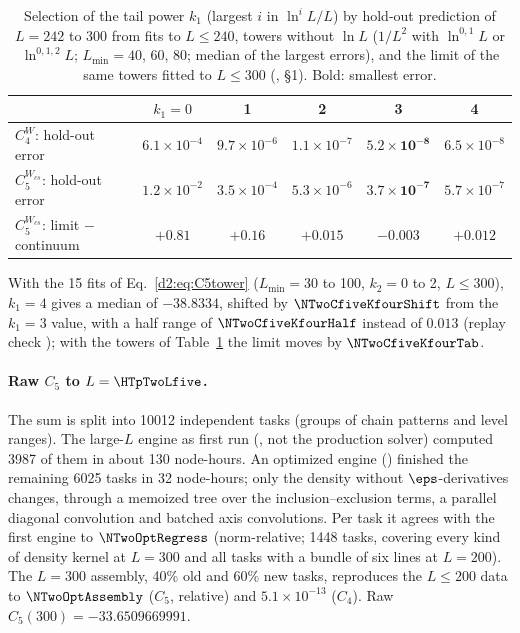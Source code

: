 \begin{table}[ht]
\centering\footnotesize\renewcommand{\arraystretch}{1.15}
\begin{tabular}{@{}lccccc@{}}
\toprule
 & $k_1=0$ & 1 & 2 & 3 & 4 \\\midrule
$C_4^W$: hold-out error & $6.1\times10^{-4}$ & $9.7\times10^{-6}$ & $1.1\times10^{-7}$ & $\mathbf{5.2\times10^{-8}}$ & $6.5\times10^{-8}$ \\
$C_5^{W_{cs}}$: hold-out error & $1.2\times10^{-2}$ & $3.5\times10^{-4}$ & $5.3\times10^{-6}$ & $\mathbf{3.7\times10^{-7}}$ & $5.7\times10^{-7}$ \\
$C_5^{W_{cs}}$: limit $-$ continuum & $+0.81$ & $+0.16$ & $+0.015$ & $-0.003$ & $+0.012$ \\
\bottomrule
\end{tabular}
\caption{Selection of the tail power $k_1$ (largest $i$ in $\ln^iL/L$) by hold-out prediction of $L=242$ to 300 from fits to
$L\le240$, towers without $\ln L$ ($1/L^2$ with $\ln^{0,1}L$ or $\ln^{0,1,2}L$; $L_{\min}=40$, 60, 80; median of the largest
errors), and the limit of the same towers fitted to $L\le300$ (,
\S1). Bold: smallest error.}
\label{d2:tab:k1}
\end{table}

With the 15 fits of Eq.~\eqref{d2:eq:C5tower} ($L_{\min}=30$ to 100, $k_2=0$ to 2, $L\le300$), $k_1=4$ gives a median of
$-38.8334$, shifted by $\NTwoCfiveKfourShift$ from the $k_1=3$ value, with a half range of $\NTwoCfiveKfourHalf$ instead of $0.013$
(replay check ); with the towers of Table~\ref{d2:tab:k1} the limit moves by $\NTwoCfiveKfourTab$.

\paragraph{Raw $C_5$ to $L=\HTpTwoLfive$.} The sum is split into 10012 independent tasks (groups of chain patterns and
level ranges). The large-$L$ engine as first run (, not the
production solver) computed 3987 of them in about 130 node-hours.
An optimized engine () finished the remaining 6025 tasks in 32 node-hours;
only the density without $\eps$-derivatives changes, through a memoized tree over the inclusion--exclusion terms, a parallel
diagonal convolution and batched axis convolutions. Per task it agrees with the first engine to $\NTwoOptRegress$
(norm-relative; 1448 tasks, covering every kind of density kernel at $L=300$ and all tasks with a bundle of six lines at
$L=200$).
The $L=300$ assembly, 40\% old and 60\% new tasks, reproduces the $L\le200$ data to $\NTwoOptAssembly$ ($C_5$, relative)
and $5.1\times10^{-13}$ ($C_4$). Raw $C_5(300)=-33.6509669991$.

